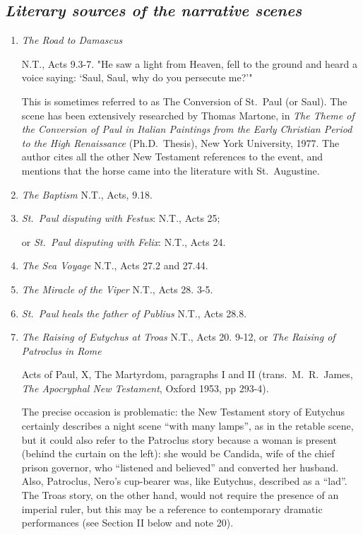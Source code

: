 \documentclass[a4paper,12pt]{article}
\begin{document}
\subsection{\textit{Literary sources of the narrative scenes}}

\begin{enumerate}
\item \textit{The Road to Damascus}

N.T., Acts 9.3-7.  "He saw a light from Heaven, fell to the ground and
heard a voice saying: `Saul, Saul, why do you persecute me?'"

This is sometimes referred to as The Conversion of St.~Paul (or Saul).
The scene has been extensively researched by Thomas Martone, in
\textit{The Theme of the Conversion of Paul in Italian Paintings from
the Early Christian Period to the High Renaissance} (Ph.D.~Thesis),
New York University, 1977.  The author cites all the other New
Testament references to the event, and mentions that the horse came
into the literature with St.~Augustine.

\item\textit{The Baptism}
N.T., Acts, 9.18.

\item\textit{St.~Paul disputing with Festus}: N.T., Acts 25; 

or \textit{St.~Paul disputing with Felix}: N.T., Acts 24.

\item\textit{The Sea Voyage}
N.T., Acts 27.2 and 27.44. 

\item\textit{The Miracle of the Viper}
N.T., Acts 28. 3-5.

\item\textit{St.~Paul heals the father of Publius}
N.T., Acts  28.8.

\item\textit{The Raising of Eutychus at Troas}
N.T., Acts 20. 9-12, 
or  \textit{The Raising of Patroclus in Rome}

Acts of Paul, X, The Martyrdom, paragraphs I and II
(trans.~M.~R.~James, \textit{The Apocryphal New Testament}, Oxford
1953, pp 293-4).

The precise occasion is problematic: the New Testament story of
Eutychus certainly describes a night scene ``with many lamps'', as in
the retable scene, but it could also refer to the Patroclus story
because a woman is present (behind the curtain on the left): she would
be Candida, wife of the chief prison governor, who ``listened and
believed'' and converted her husband.  Also, Patroclus, Nero's
cup-bearer was, like Eutychus, described as a ``lad''. The Troas
story, on the other hand, would not require the presence of an
imperial ruler, but this may be a reference to contemporary dramatic
performances (see Section II below and note 20).


\end{enumerate}
\end{document}
